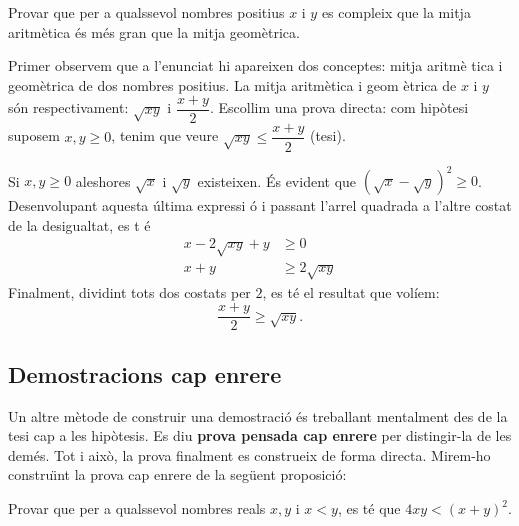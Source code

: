 \begin{exemple}
Provar que per a qualssevol nombres positius $x$ i $y$ es compleix que la
mitja aritm\`{e}tica \'{e}s m\'{e}s gran que la mitja geom\`{e}trica.
\end{exemple}

\begin{solucio}
Primer observem que a l'enunciat hi apareixen dos conceptes: mitja aritm\`{e}%
tica i geom\`{e}trica de dos nombres positius. La mitja aritm\`{e}tica i geom%
\`{e}trica de $x$ i $y$ s\'{o}n respectivament: $\sqrt{xy}$ i $\dfrac{x+y}{2}
$. Escollim una prova directa: com hip\`{o}tesi suposem $x,y\geq0$, tenim
que veure $\sqrt{xy}\leq\dfrac{x+y}{2}$ (tesi).

Si $x,y\geq0$ aleshores $\sqrt{x}$ i $\sqrt{y}$ existeixen. \'{E}s evident
que $(\sqrt{x}-\sqrt{y})^{2}\geq0$. Desenvolupant aquesta \'{u}ltima expressi%
\'{o} i passant l'arrel quadrada a l'altre costat de la desigualtat, es t%
\'{e}%
\begin{align*}
x-2\sqrt{xy}+y & \geq0 \\
x+y & \geq2\sqrt{xy}
\end{align*}
Finalment, dividint tots dos costats per $2$, es t\'{e} el resultat que
volíem:%
\begin{equation*}
\frac{x+y}{2}\geq\sqrt{xy}\text{.}
\end{equation*}
\end{solucio}

\subsection{Demostracions cap enrere}

Un altre m\`{e}tode de construir una demostraci\'{o} \'{e}s treballant
mentalment des de la tesi cap a les hip\`{o}tesis. Es diu \textbf{prova
pensada cap enrere} per distingir-la de les dem\'{e}s. Tot i aix\`{o}, la
prova finalment es construeix de forma directa. Mirem-ho constru\"{\i}nt la
prova cap enrere de la seg\"{u}ent proposici\'{o}:

\begin{exemple}
Provar que per a qualssevol nombres reals $x,y$ i $x<y$, es t\'{e} que $%
4xy<(x+y)^{2}$.
\end{exemple}

